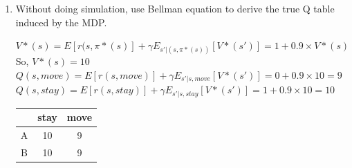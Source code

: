 \documentclass[a4paper]{article}
\theoremstyle{definition}
\newenvironment{soln}{
    \leavevmode\color{blue}\ignorespaces
}{}
\begin{document}
\begin{enumerate}
\begin{soln}
\end{soln}

\item Without doing simulation, use Bellman equation to derive the true Q table induced by the MDP.
\begin{soln}
$V*(s) = E[r(s,\pi*(s)] + \gamma E_{s' |(s, \pi*(s))} [V*(s')] = 1 + 0.9\times V*(s)$\\  
So, $V*(s) = 10$
$Q(s, move) = E[r(s, move)] + \gamma E_{s' |s, move}[V*(s')] = 0 + 0.9\times 10 = 9$\\
$Q(s, stay) = E[r(s, stay)] + \gamma E_{s' |s, stay}[V*(s')] = 1 + 0.9\times 10 = 10$\\

\begin{center}
\begin{tabular}{ |c|c|c| } 
 \hline
  & stay& move \\ 
 \hline
 A & 10 & 9 \\ 
 \hline
B & 10& 9\\ 
 \hline
\end{tabular}
\end{center}

\end{soln}


\end{enumerate}
\end{document}
